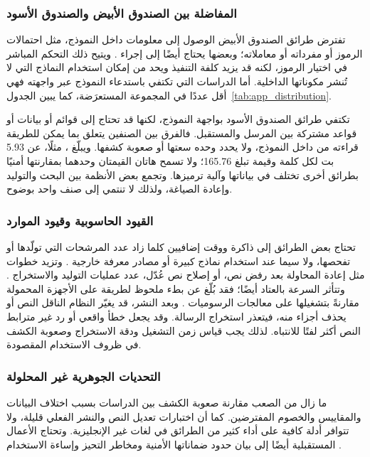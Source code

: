 \subsubsection{المفاضلة بين الصندوق الأبيض والصندوق الأسود}

تفترض طرائق الصندوق الأبيض الوصول إلى معلومات داخل النموذج، مثل احتمالات الرموز أو مفرداته أو معاملاته؛ وبعضها يحتاج أيضًا إلى إجراء . ويتيح ذلك التحكم المباشر في اختيار الرموز، لكنه قد يزيد كلفة التنفيذ ويحد من إمكان استخدام النماذج التي لا تُنشر مكوناتها الداخلية. أما الدراسات التي تكتفي باستدعاء النموذج عبر واجهته فهي أقل عددًا في المجموعة المستعرَضة، كما يبين الجدول~\ref{tab:app_distribution}.

تكتفي طرائق الصندوق الأسود بواجهة النموذج، لكنها قد تحتاج إلى قوائم أو بيانات أو قواعد مشتركة بين المرسل والمستقبل. فالفرق بين الصنفين يتعلق بما يمكن للطريقة قراءته من داخل النموذج، ولا يحدد وحده سعتها أو صعوبة كشفها. ويبلّغ ، مثلًا، عن 5.93 بت لكل كلمة وقيمة  تبلغ 165.76؛ ولا تسمح هاتان القيمتان وحدهما بمقارنتها أمنيًا بطرائق أخرى تختلف في بياناتها وآلية ترميزها. وتجمع بعض الأنظمة بين البحث والتوليد وإعادة الصياغة، ولذلك لا تنتمي إلى صنف واحد بوضوح.

\subsubsection{القيود الحاسوبية وقيود الموارد}

تحتاج بعض الطرائق إلى ذاكرة ووقت إضافيين كلما زاد عدد المرشحات التي تولّدها أو تفحصها، ولا سيما عند استخدام نماذج كبيرة أو مصادر معرفة خارجية \cite{kaptchuk2021meteor,ding2023discop}. وتزيد خطوات مثل إعادة المحاولة بعد رفض نص، أو إصلاح نص عُدّل، عدد عمليات التوليد والاستخراج \cite{qi2024provably}. وتتأثر السرعة بالعتاد أيضًا؛ فقد بُلّغ عن بطء ملحوظ لطريقة  على الأجهزة المحمولة مقارنةً بتشغيلها على معالجات الرسوميات \cite{kaptchuk2021meteor}. وبعد النشر، قد يغيّر النظام الناقل النص أو يحذف أجزاء منه، فيتعذر استخراج الرسالة. وقد يجعل خطأ واقعي أو رد غير مترابط النص أكثر لفتًا للانتباه. لذلك يجب قياس زمن التشغيل ودقة الاستخراج وصعوبة الكشف في ظروف الاستخدام المقصودة.

\subsubsection{التحديات الجوهرية غير المحلولة}

ما زال من الصعب مقارنة صعوبة الكشف بين الدراسات بسبب اختلاف البيانات والمقاييس والخصوم المفترضين. كما أن اختبارات تعديل النص والنشر الفعلي قليلة، ولا تتوافر أدلة كافية على أداء كثير من الطرائق في لغات غير الإنجليزية. وتحتاج الأعمال المستقبلية أيضًا إلى بيان حدود ضماناتها الأمنية ومخاطر التحيز وإساءة الاستخدام \cite{zheng2022general,qiang2023natural,lin2024zero,bender2021dangers}.

